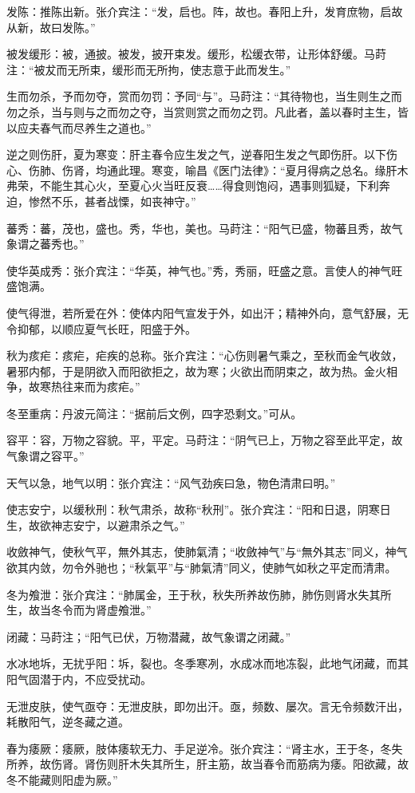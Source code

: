 \documentclass[draft,12pt]{ctexbook}
\begin{document}
\begin{jiaozhu}
  \item 发陈：推陈出新。张介宾注：“发，启也。阵，故也。春阳上升，发育庶物，启故从新，故曰发陈。”
  \item 被发缓形：被，通披。被发，披开束发。缓形，松缓衣带，让形体舒缓。马莳注：“被犮而无所束，缓形而无所拘，使志意于此而发生。”
  \item 生而勿杀，予而勿夺，赏而勿罚：予同“与”。马莳注：“其待物也，当生则生之而勿之杀，当与则与之而勿之夺，当赏则赏之而勿之罚。凡此者，盖以春时主生，皆以应夫春气而尽养生之道也。”
  \item 逆之则伤肝，夏为寒变：肝主春令应生发之气，逆春阳生发之气即伤肝。以下伤心、伤肺、伤肾，均通此理。寒变，喻昌《医门法律》：“夏月得病之总名。缘肝木弗荣，不能生其心火，至夏心火当旺反衰……得食则饱闷，遇事则狐疑，下利奔迫，惨然不乐，甚者战慄，如丧神守。”
  \item 蕃秀：蕃，茂也，盛也。秀，华也，美也。马莳注：“阳气已盛，物蕃且秀，故气象谓之蕃秀也。”
  \item 使华英成秀：张介宾注：“华英，神气也。”秀，秀丽，旺盛之意。言使人的神气旺盛饱满。
  \item 使气得泄，若所爱在外：使体内阳气宣发于外，如出汗；精神外向，意气舒展，无令抑郁，以顺应夏气长旺，阳盛于外。
  \item 秋为痎疟：痎疟，疟疾的总称。张介宾注：“心伤则暑气乘之，至秋而金气收敛，暑邪内郁，于是阴欲入而阳欲拒之，故为寒；火欲出而阴束之，故为热。金火相争，故寒热往来而为痎疟。”
  \item 冬至重病：丹波元简注：“据前后文例，四字恐剩文。”可从。
  \item 容平：容，万物之容貌。平，平定。马莳注：“阴气已上，万物之容至此平定，故气象谓之容平。”
  \item 天气以急，地气以明：张介宾注：“风气劲疾曰急，物色清肃曰明。”
  \item 使志安宁，以缓秋刑：秋气肃杀，故称“秋刑”。张介宾注：“阳和日退，阴寒日生，故欲神志安宁，以避肃杀之气。”
  \item 收斂神气，使秋气平，無外其志，使肺氣清；“收斂神气”与“無外其志”同义，神气欲其内敛，勿令外驰也；“秋氣平”与“肺氣清”同义，使肺气如秋之平定而清肃。
  \item 冬为飧泄：张介宾注：“肺属金，王于秋，秋失所养故伤肺，肺伤则肾水失其所生，故当冬令而为肾虚飧泄。”
  \item 闭藏：马莳注；“阳气已伏，万物潜藏，故气象谓之闭藏。”
  \item 水冰地坼，无扰乎阳：坼，裂也。冬季寒冽，水成冰而地冻裂，此地气闭藏，而其阳气固潜于内，不应受扰动。
  \item 无泄皮肤，使气亟夺：无泄皮肤，即勿出汗。亟，频数、屡次。言无令频数汗出，耗散阳气，逆冬藏之道。
  \item 春为痿厥：痿厥，肢体痿软无力、手足逆冷。张介宾注：“肾主水，王于冬，冬失所养，故伤肾。肾伤则肝木失其所生，肝主筋，故当春令而筋病为痿。阳欲藏，故冬不能藏则阳虚为厥。”
\end{jiaozhu}
\end{document}
